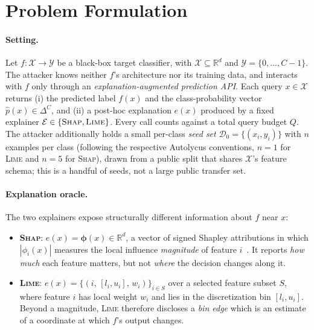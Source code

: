 \documentclass[sigconf,anonymous,review]{acmart}
\begin{document}
\section{Problem Formulation}
\label{sec:problem}

\paragraph{Setting.}
Let $f : \mathcal{X} \to \mathcal{Y}$ be a black-box target classifier, with
$\mathcal{X} \subseteq \mathbb{R}^d$ and $\mathcal{Y} = \{0, \ldots, C{-}1\}$.
The attacker knows neither $f$'s architecture nor its training data, and interacts
with $f$ only through an \emph{explanation-augmented prediction API}.
Each query $x \in \mathcal{X}$ returns (i) the predicted label $f(x)$ and the
class-probability vector $\hat{p}(x) \in \Delta^{C}$, and (ii) a post-hoc
explanation $e(x)$ produced by a fixed explainer
$\mathcal{E} \in \{\textsc{Shap}, \textsc{Lime}\}$.
Every call counts against a total query budget $Q$.
The attacker additionally holds a small per-class \emph{seed set}
$\mathcal{D}_{0} = \{(x_i, y_i)\}$ with $n$ examples per class (following the respective
Autolycus conventions, $n{=}1$ for \textsc{Lime} and $n{=}5$ for \textsc{Shap}), drawn from a
public split that shares $\mathcal{X}$'s feature schema;
this is a handful of seeds, not a large public transfer set.

\paragraph{Explanation oracle.}
The two explainers expose structurally different information about $f$ near $x$:
\begin{itemize}
  \item \textbf{\textsc{Shap}}: $e(x) = \bm{\phi}(x) \in \mathbb{R}^{d}$, a vector of
  signed Shapley attributions in which $|\phi_i(x)|$ measures the local influence
  \emph{magnitude} of feature $i$~\cite{lundberg2017shap}. It reports \emph{how much}
  each feature matters, but not \emph{where} the decision changes along it.
  \item \textbf{\textsc{Lime}}: $e(x) = \{(i,\, [l_i, u_i],\, w_i)\}_{i \in S}$ over a
  selected feature subset $S$, where feature $i$ has local weight $w_i$ and lies in
  the discretization bin $[l_i, u_i]$. Beyond a magnitude, \textsc{Lime} therefore
  discloses a \emph{bin edge} which is an estimate of a coordinate at which $f$'s output
  changes.
\end{itemize}
\end{document}
